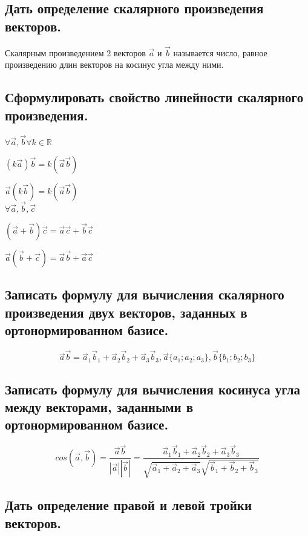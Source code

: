 \documentclass[a4paper, 10pt]{article}
\begin{document}
\subsection{Дать определение скалярного произведения векторов.}

Скалярным произведением 2 векторов $\vec{a}$ и $\vec{b}$ называется число, равное произведению длин
векторов на косинус угла между ними.

\subsection{Сформулировать свойство линейности скалярного произведения.}

\begin{center}
$\forall \vec{a}, \vec{b} \forall k \in \mathbb{R}$

$(k\vec{a})\vec{b} = k(\vec{a}\vec{b})$

$\vec{a}(k\vec{b}) = k(\vec{a}\vec{b})$\\

$\forall \vec{a}, \vec{b}, \vec{c}$

$(\vec{a} + \vec{b})\vec{c} = \vec{a}\vec{c} + \vec{b}\vec{c}$

$\vec{a}(\vec{b} + \vec{c}) = \vec{a}\vec{b} + \vec{a}\vec{c}$
\end{center}

\subsection{Записать формулу для вычисления скалярного произведения двух векторов, заданных в ортонормированном базисе.}

$$\vec{a}\vec{b} = \vec{a}_1\vec{b}_1 + \vec{a}_2\vec{b}_2 + \vec{a}_3\vec{b}_3,
\vec{a}\{a_1;a_2;a_3\},\vec{b}\{b_1;b_2;b_3\} $$

\subsection{Записать формулу для вычисления косинуса угла между векторами, заданными в ортонормированном базисе.}

$$cos(\vec{a},\vec{b}) = \frac{ \vec{a} \vec{b} }{ |\vec{a}| |\vec{b}| } = 
\frac{\vec{a}_1\vec{b}_1 + \vec{a}_2\vec{b}_2 + \vec{a}_3\vec{b}_3}
{\sqrt{\vec{a}_1 + \vec{a}_2 + \vec{a}_3}\sqrt{\vec{b}_1+\vec{b}_2+\vec{b}_3}}$$

\subsection{Дать определение правой и левой тройки векторов.}
\end{document}
